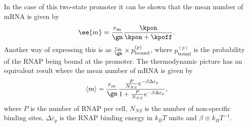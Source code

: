 In the case of this two-state promoter it can be shown that the mean number of
mRNA is given by \cite{Phillips2015}
\begin{equation}
  \ee{m} = {r_m \over \gm} {\kpon \over \kpon + \kpoff}.
\end{equation}
Another way of expressing this is as ${r_m \over \gm} \times
p_{\text{bound}}^{(p)}$, where $p_{\text{bound}}^{(p)}$ is the probability of
the RNAP being bound at the promoter. The thermodynamic picture has an
equivalent result where the mean number of mRNA is given by \cite{Brewster2012,
Bintu2005a} \begin{equation} \left\langle m \right\rangle = {r_m \over \gm} {{P
\over N_{NS}} e^{-\beta\Delta\varepsilon_p} \over 1 + {P \over N_{NS}}
e^{-\beta\Delta\varepsilon_p}}, \end{equation} where $P$ is the number of RNAP
per cell, $N_{NS}$ is the number of non-specific binding sites,
$\Delta\varepsilon_p$ is the RNAP binding energy in $k_BT$ units and
$\beta\equiv {k_BT}^{-1}$.

